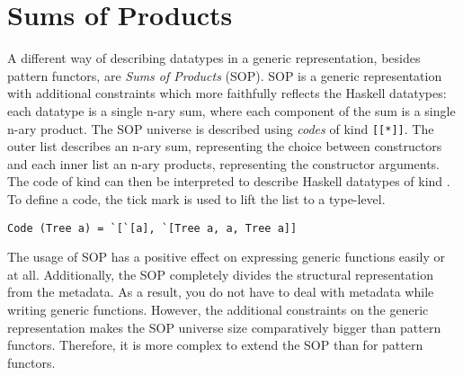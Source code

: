 \section{Sums of Products}

A different way of describing datatypes in a generic representation, besides pattern functors, are \textit{Sums of Products}\cite{vries2014sums} (SOP). SOP is a generic representation with additional constraints which more faithfully reflects the Haskell datatypes: each datatype is a single n-ary sum, where each component of the sum is a single n-ary product. The SOP universe is described using \textit{codes} of kind \texttt{[[*]]}. The outer list describes an n-ary sum, representing the choice between constructors and each inner list an n-ary products, representing the constructor arguments.  The code of kind \inlinehaskell{[[*]]} can then be interpreted to describe Haskell datatypes of kind \inlinehaskell{*}. To define a code, the tick mark  is used to lift the list to a type-level. 

\begin{verbatim}
Code (Tree a) = `[`[a], `[Tree a, a, Tree a]]
\end{verbatim}

The usage of SOP has a positive effect on expressing generic functions easily or at all. Additionally, the SOP completely divides the structural representation from the metadata. As a result, you do not have to deal with metadata while writing generic functions. However, the additional constraints on the generic representation makes the SOP universe size comparatively bigger than pattern functors. Therefore, it is more complex to extend the SOP than for pattern functors.

